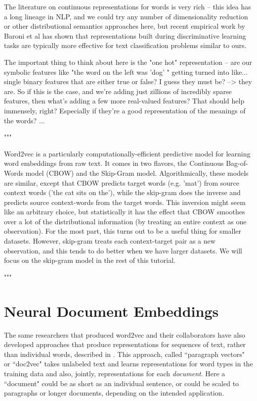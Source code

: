 The literature on continuous representations for words is very rich -- this
idea has a long lineage in NLP, and we could try any number of dimensionality
reduction or other distributional semantics approaches here, but recent
empirical work by Baroni et al \cite{baroni2014don} has shown that
representations built during discriminative learning tasks are typically more
effective for text classification problems similar to ours.


The important thing to think about here is the "one hot" representation -- are
our symbolic features like "the word on the left was 'dog' " getting turned into
like... single binary features that are either true or false? I guess they must
be?  --> they are. So if this is the case, and we're adding just zillions of
incredibly sparse features, then what's adding a few more real-valued features?
That should help immensely, right? Especially if they're a good representation
of the meanings of the words? ...

"""

Word2vec is a particularly computationally-efficient predictive model
for learning word embeddings from raw text. It comes in two flavors,
the Continuous Bag-of-Words model (CBOW) and the Skip-Gram model.
Algorithmically, these models are similar, except that CBOW predicts
target words (e.g. 'mat') from source context words ('the cat sits on
the'), while the skip-gram does the inverse and predicts source
context-words from the target words. This inversion might seem like an
arbitrary choice, but statistically it has the effect that CBOW
smoothes over a lot of the distributional information (by treating an
entire context as one observation). For the most part, this turns out
to be a useful thing for smaller datasets. However, skip-gram treats
each context-target pair as a new observation, and this tends to do
better when we have larger datasets. We will focus on the skip-gram
model in the rest of this tutorial.

"""

\section{Neural Document Embeddings}
The same researchers that produced word2vec and their collaborators have also
developed approaches that produce representations for sequences of text, rather
than individual words, described in
\cite{dai-document-embedding-2015,quocle-distributed-representations-2014}.
This approach, called ``paragraph vectors" or ``doc2vec" takes unlabeled text
and learns representations for word types in the training data and also,
jointly, representations for each \emph{document}. Here a ``document" could be
as short as an individual sentence, or could be scaled to paragraphs or longer
documents, depending on the intended application.

